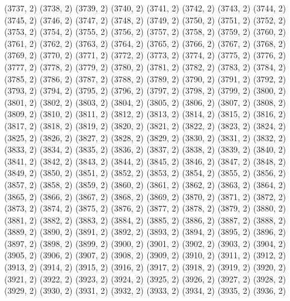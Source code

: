 {   (3737, 2)
   (3738, 2)
   (3739, 2)
   (3740, 2)
   (3741, 2)
   (3742, 2)
   (3743, 2)
   (3744, 2)
   (3745, 2)
   (3746, 2)
   (3747, 2)
   (3748, 2)
   (3749, 2)
   (3750, 2)
   (3751, 2)
   (3752, 2)
   (3753, 2)
   (3754, 2)
   (3755, 2)
   (3756, 2)
   (3757, 2)
   (3758, 2)
   (3759, 2)
   (3760, 2)
   (3761, 2)
   (3762, 2)
   (3763, 2)
   (3764, 2)
   (3765, 2)
   (3766, 2)
   (3767, 2)
   (3768, 2)
   (3769, 2)
   (3770, 2)
   (3771, 2)
   (3772, 2)
   (3773, 2)
   (3774, 2)
   (3775, 2)
   (3776, 2)
   (3777, 2)
   (3778, 2)
   (3779, 2)
   (3780, 2)
   (3781, 2)
   (3782, 2)
   (3783, 2)
   (3784, 2)
   (3785, 2)
   (3786, 2)
   (3787, 2)
   (3788, 2)
   (3789, 2)
   (3790, 2)
   (3791, 2)
   (3792, 2)
   (3793, 2)
   (3794, 2)
   (3795, 2)
   (3796, 2)
   (3797, 2)
   (3798, 2)
   (3799, 2)
   (3800, 2)
   (3801, 2)
   (3802, 2)
   (3803, 2)
   (3804, 2)
   (3805, 2)
   (3806, 2)
   (3807, 2)
   (3808, 2)
   (3809, 2)
   (3810, 2)
   (3811, 2)
   (3812, 2)
   (3813, 2)
   (3814, 2)
   (3815, 2)
   (3816, 2)
   (3817, 2)
   (3818, 2)
   (3819, 2)
   (3820, 2)
   (3821, 2)
   (3822, 2)
   (3823, 2)
   (3824, 2)
   (3825, 2)
   (3826, 2)
   (3827, 2)
   (3828, 2)
   (3829, 2)
   (3830, 2)
   (3831, 2)
   (3832, 2)
   (3833, 2)
   (3834, 2)
   (3835, 2)
   (3836, 2)
   (3837, 2)
   (3838, 2)
   (3839, 2)
   (3840, 2)
   (3841, 2)
   (3842, 2)
   (3843, 2)
   (3844, 2)
   (3845, 2)
   (3846, 2)
   (3847, 2)
   (3848, 2)
   (3849, 2)
   (3850, 2)
   (3851, 2)
   (3852, 2)
   (3853, 2)
   (3854, 2)
   (3855, 2)
   (3856, 2)
   (3857, 2)
   (3858, 2)
   (3859, 2)
   (3860, 2)
   (3861, 2)
   (3862, 2)
   (3863, 2)
   (3864, 2)
   (3865, 2)
   (3866, 2)
   (3867, 2)
   (3868, 2)
   (3869, 2)
   (3870, 2)
   (3871, 2)
   (3872, 2)
   (3873, 2)
   (3874, 2)
   (3875, 2)
   (3876, 2)
   (3877, 2)
   (3878, 2)
   (3879, 2)
   (3880, 2)
   (3881, 2)
   (3882, 2)
   (3883, 2)
   (3884, 2)
   (3885, 2)
   (3886, 2)
   (3887, 2)
   (3888, 2)
   (3889, 2)
   (3890, 2)
   (3891, 2)
   (3892, 2)
   (3893, 2)
   (3894, 2)
   (3895, 2)
   (3896, 2)
   (3897, 2)
   (3898, 2)
   (3899, 2)
   (3900, 2)
   (3901, 2)
   (3902, 2)
   (3903, 2)
   (3904, 2)
   (3905, 2)
   (3906, 2)
   (3907, 2)
   (3908, 2)
   (3909, 2)
   (3910, 2)
   (3911, 2)
   (3912, 2)
   (3913, 2)
   (3914, 2)
   (3915, 2)
   (3916, 2)
   (3917, 2)
   (3918, 2)
   (3919, 2)
   (3920, 2)
   (3921, 2)
   (3922, 2)
   (3923, 2)
   (3924, 2)
   (3925, 2)
   (3926, 2)
   (3927, 2)
   (3928, 2)
   (3929, 2)
   (3930, 2)
   (3931, 2)
   (3932, 2)
   (3933, 2)
   (3934, 2)
   (3935, 2)
   (3936, 2)
}
